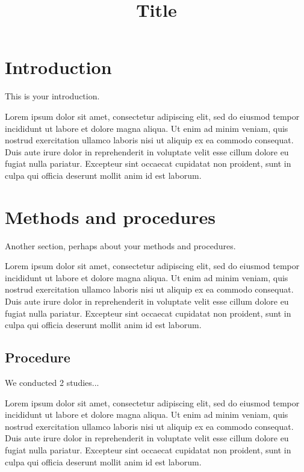 \documentclass[jou, floatsintext, colorlinks=true, linkcolor=blue, citecolor=blue, urlcolor=blue]{apa7} %
\title{Title}
\begin{document}
\maketitle

\section{Introduction}

This is your introduction.

Lorem ipsum dolor sit amet, consectetur adipiscing elit, sed do eiusmod tempor incididunt ut labore et dolore magna aliqua. Ut enim ad minim veniam, quis nostrud exercitation ullamco laboris nisi ut aliquip ex ea commodo consequat. Duis aute irure dolor in reprehenderit in voluptate velit esse cillum dolore eu fugiat nulla pariatur. Excepteur sint occaecat cupidatat non proident, sunt in culpa qui officia deserunt mollit anim id est laborum.




\section{Methods and procedures}

Another section, perhaps about your methods and procedures.

Lorem ipsum dolor sit amet, consectetur adipiscing elit, sed do eiusmod tempor incididunt ut labore et dolore magna aliqua. Ut enim ad minim veniam, quis nostrud exercitation ullamco laboris nisi ut aliquip ex ea commodo consequat. Duis aute irure dolor in reprehenderit in voluptate velit esse cillum dolore eu fugiat nulla pariatur. Excepteur sint occaecat cupidatat non proident, sunt in culpa qui officia deserunt mollit anim id est laborum.




\subsection{Procedure}

We conducted 2 studies...

Lorem ipsum dolor sit amet, consectetur adipiscing elit, sed do eiusmod tempor incididunt ut labore et dolore magna aliqua. Ut enim ad minim veniam, quis nostrud exercitation ullamco laboris nisi ut aliquip ex ea commodo consequat. Duis aute irure dolor in reprehenderit in voluptate velit esse cillum dolore eu fugiat nulla pariatur. Excepteur sint occaecat cupidatat non proident, sunt in culpa qui officia deserunt mollit anim id est laborum.
\end{document}
